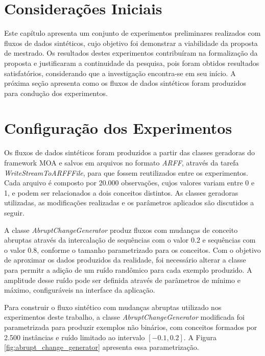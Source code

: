\documentclass[qual, classic, a4paper]{ufbathesis}
\begin{document}
 \label{experimentos_iniciais}
\section{Considerações Iniciais}

Este capítulo apresenta um conjunto de experimentos preliminares realizados com fluxos de dados sintéticos, 
cujo objetivo foi demonstrar a viabilidade da proposta de mestrado.
%
Os resultados destes experimentos contribuíram na formalização da proposta e justificaram a continuidade da pesquisa, 
pois foram obtidos resultados satisfatórios, considerando que a investigação encontra-se em seu início.
%
A próxima seção apresenta como os fluxos de dados sintéticos foram produzidos para condução dos experimentos.

\section{Configuração dos Experimentos}

Os fluxos de dados sintéticos foram produzidos a partir das classes geradoras do framework MOA \cite{Bifet:2010:MMO:1756006.1859903} e salvos em arquivos no formato \textit{ARFF}, através da tarefa \textit{WriteStreamToARFFFile}, para que fossem reutilizados entre os experimentos. 
Cada arquivo é composto por 20.000 observações, cujos valores variam entre 0 e 1, e podem ser relacionados a dois conceitos distintos.
As classes geradoras utilizadas, as modificações realizadas e os parâmetros aplicados são discutidos a seguir.

A classe \textit{AbruptChangeGenerator} produz fluxos com mudanças de conceito abruptas através da intercalação de sequências com o valor $0.2$ e sequências com o valor $0.8$, conforme o tamanho parametrizado para os conceitos.
Com o objetivo de aproximar os dados produzidos da realidade, foi necessário alterar a classe para permitr a adição de um ruído randômico para cada exemplo produzido.
A amplitude desse ruído pode ser definida através de parâmetros de mínimo e máximo, configuráveis na interface da aplicação.

Para construir o fluxo sintético com mudanças abruptas utilizado nos experimentos deste trabalho, 
a classe \textit{AbruptChangeGenerator} modificada foi parametrizada para produzir exemplos não binários, 
com conceitos formados por 2.500 instâncias e ruído limitado ao intervalo $[-0.1, 0.2]$.
A Figura \ref{fig:abrupt_change_generator} apresenta essa parametrização.
\end{document}
